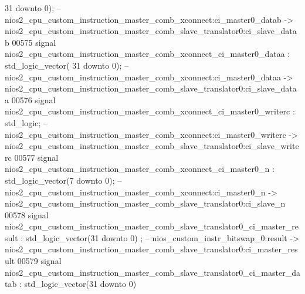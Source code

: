 \begin{DoxyCode}
{      31} \textcolor{keywordflow}{downto} \textcolor{vhdllogic}{}\textcolor{vhdllogic}{0}\textcolor{vhdlchar}{)};\textcolor{keyword}{ -- nios2\_cpu\_custom\_instruction\_master\_comb\_xconnect:ci\_master0\_datab ->
       nios2\_cpu\_custom\_instruction\_master\_comb\_slave\_translator0:ci\_slave\_datab}
00575     \textcolor{keywordflow}{signal} \textcolor{vhdlchar}{nios2_cpu_custom_instruction_master_comb_xconnect_ci_master0_dataa}          \textcolor{vhdlchar}{:} \textcolor{comment}{std\_logic\_vector}\textcolor{vhdlchar}{(}\textcolor{vhdllogic}{}\textcolor{vhdllogic}{
      31} \textcolor{keywordflow}{downto} \textcolor{vhdllogic}{}\textcolor{vhdllogic}{0}\textcolor{vhdlchar}{)};\textcolor{keyword}{ -- nios2\_cpu\_custom\_instruction\_master\_comb\_xconnect:ci\_master0\_dataa ->
       nios2\_cpu\_custom\_instruction\_master\_comb\_slave\_translator0:ci\_slave\_dataa}
00576     \textcolor{keywordflow}{signal} \textcolor{vhdlchar}{nios2_cpu_custom_instruction_master_comb_xconnect_ci_master0_writerc}        \textcolor{vhdlchar}{:} \textcolor{comment}{std\_logic};\textcolor{keyword}{        
                   -- nios2\_cpu\_custom\_instruction\_master\_comb\_xconnect:ci\_master0\_writerc ->
       nios2\_cpu\_custom\_instruction\_master\_comb\_slave\_translator0:ci\_slave\_writerc}
00577     \textcolor{keywordflow}{signal} \textcolor{vhdlchar}{nios2_cpu_custom_instruction_master_comb_xconnect_ci_master0_n}              \textcolor{vhdlchar}{:} \textcolor{comment}{std\_logic\_vector}\textcolor{vhdlchar}{(}\textcolor{vhdllogic}{}\textcolor{vhdllogic}{7}
       \textcolor{keywordflow}{downto} \textcolor{vhdllogic}{}\textcolor{vhdllogic}{0}\textcolor{vhdlchar}{)};\textcolor{keyword}{  -- nios2\_cpu\_custom\_instruction\_master\_comb\_xconnect:ci\_master0\_n ->
       nios2\_cpu\_custom\_instruction\_master\_comb\_slave\_translator0:ci\_slave\_n}
00578     \textcolor{keywordflow}{signal} \textcolor{vhdlchar}{
      nios2_cpu_custom_instruction_master_comb_slave_translator0_ci_master_result} \textcolor{vhdlchar}{:} \textcolor{comment}{std\_logic\_vector}\textcolor{vhdlchar}{(}\textcolor{vhdllogic}{}\textcolor{vhdllogic}{31} \textcolor{keywordflow}{downto} \textcolor{vhdllogic}{}\textcolor{vhdllogic}{0}\textcolor{vhdlchar}{)}
      ;\textcolor{keyword}{ -- nios\_custom\_instr\_bitswap\_0:result ->
       nios2\_cpu\_custom\_instruction\_master\_comb\_slave\_translator0:ci\_master\_result}
00579     \textcolor{keywordflow}{signal} \textcolor{vhdlchar}{
      nios2_cpu_custom_instruction_master_comb_slave_translator0_ci_master_datab}  \textcolor{vhdlchar}{:} \textcolor{comment}{std\_logic\_vector}\textcolor{vhdlchar}{(}\textcolor{vhdllogic}{}\textcolor{vhdllogic}{31} \textcolor{keywordflow}{downto} \textcolor{vhdllogic}{}\textcolor{vhdllogic}{0}\textcolor{vhdlchar}{)}

\end{DoxyCode}
